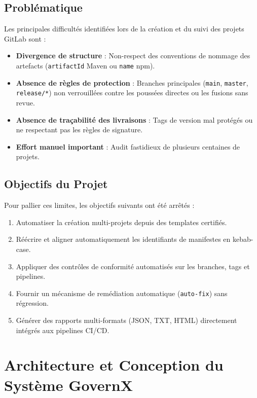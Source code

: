 \documentclass[12pt,a4paper]{report}
\begin{document}
\section{Problématique}
Les principales difficultés identifiées lors de la création et du suivi des projets GitLab sont :
\begin{itemize}
    \item \textbf{Divergence de structure} : Non-respect des conventions de nommage des artefacts (\texttt{artifactId} Maven ou \texttt{name} npm).
    \item \textbf{Absence de règles de protection} : Branches principales (\texttt{main}, \texttt{master}, \texttt{release/*}) non verrouillées contre les poussées directes ou les fusions sans revue.
    \item \textbf{Absence de traçabilité des livraisons} : Tags de version mal protégés ou ne respectant pas les règles de signature.
    \item \textbf{Effort manuel important} : Audit fastidieux de plusieurs centaines de projets.
\end{itemize}

\section{Objectifs du Projet}
Pour pallier ces limites, les objectifs suivants ont été arrêtés :
\begin{infoBox}
\begin{enumerate}
    \item Automatiser la création multi-projets depuis des templates certifiés.
    \item Réécrire et aligner automatiquement les identifiants de manifestes en kebab-case.
    \item Appliquer des contrôles de conformité automatisés sur les branches, tags et pipelines.
    \item Fournir un mécanisme de remédiation automatique (\texttt{auto-fix}) sans régression.
    \item Générer des rapports multi-formats (JSON, TXT, HTML) directement intégrés aux pipelines CI/CD.
\end{enumerate}
\end{infoBox}

\chapter{Architecture et Conception du Système GovernX}
\end{document}

